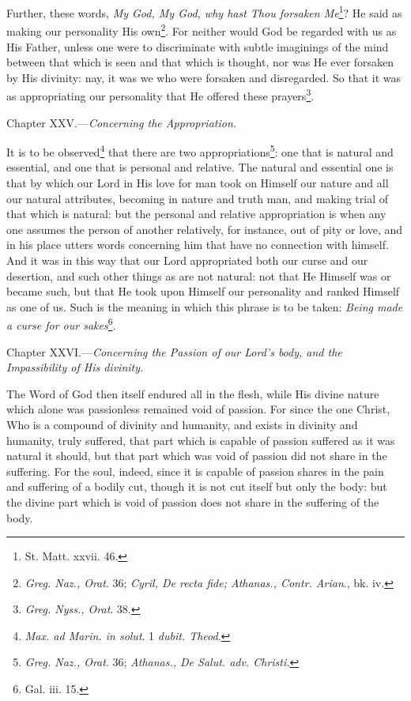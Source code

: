 Further, these words, \emph{My God, My God, why hast Thou forsaken Me}\footnote{St. Matt. xxvii. 46.}? He said as making our personality His own\footnote{\emph{Greg. Naz., Orat}. 36; \emph{Cyril, De recta fide; Athanas., Contr. Arian}., bk. iv.}. For neither would God be regarded with us as His Father, unless one were to discriminate with subtle imaginings of the mind between that which is seen and that which is thought, nor was He ever forsaken by His divinity: nay, it was we who were forsaken and disregarded. So that it was as appropriating our personality that He offered these prayers\footnote{\emph{Greg. Nyss., Orat}. 38.}.


Chapter XXV.—\emph{Concerning the Appropriation.}

It is to be observed\footnote{\emph{Max. ad Marin. in solut}. 1 \emph{dubit. Theod}.} that there are two appropriations\footnote{\emph{Greg. Naz., Orat}. 36; \emph{Athanas., De Salut. adv. Christi.}}: one that is natural and essential, and one that is personal and relative. The natural and essential one is that by which our Lord in His love for man took on Himself our nature and all our natural attributes, becoming in nature and truth man, and making trial of that which is natural: but the personal and relative appropriation is when any one assumes the person of another relatively, for instance, out of pity or love, and in his place utters words concerning him that have no connection with himself. And it was in this way that our Lord appropriated both our curse and our desertion, and such other things as are not natural: not that He Himself was or became such, but that He took upon Himself our personality and ranked Himself as one of us. Such is the meaning in which this phrase is to be taken: \emph{Being made a curse for our sakes}\footnote{Gal. iii. 15.}.


Chapter XXVI.—\emph{Concerning the Passion of our Lord’s body, and the Impassibility of His divinity.}

The Word of God then itself endured all in the flesh, while His divine nature which alone was passionless remained void of passion. For since the one Christ, Who is a compound of divinity and humanity, and exists in divinity and humanity, truly suffered, that part which is capable of passion suffered as it was natural it should, but that part which was void of passion did not share in the suffering. For the soul, indeed, since it is capable of passion shares in the pain and suffering of a bodily cut, though it is not cut itself but only the body: but the divine part which is void of passion does not share in the suffering of the body.

